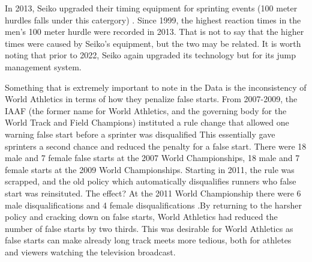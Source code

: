 \documentclass[12pt, letterpaper, titlepage]{article}
\begin{document}
In 2013, Seiko upgraded their timing equipment for sprinting events (100 meter hurdles
falls under this catergory) \citep{WorldAthletics_2013}.  Since 1999, the highest reaction 
times in the men's 100 meter hurdle were recorded in 2013.  That is not to say that the higher 
times were caused by Seiko's equipment, but the two may be related.  It is worth noting that prior
to 2022, Seiko again upgraded its technology but for its jump management system.

Something that is extremely important to note in the Data is the inconsistency of World Athletics in terms of how they penalize false starts.  From 2007-2009, the IAAF (the former name for World Athletics, and the governing body for the World Track and Field Champions) instituted a rule change that allowed one warning false start before a sprinter was disqualified \citep{False-Start}  This essentially gave sprinters a second chance and reduced
the penalty for a false start.  There were 18 male and 7 female false starts at the 2007
World Championships, 18 male and 7 female starts at the 2009 World Championships.
Starting in 2011, the rule was scrapped, and the old policy which automatically disqualifies runners who false start was reinsituted.  The effect? At the 2011 World
Championship there were 6 male disqualifications and 4 female disqualifications \citep{False-Start} .By returning to the harsher policy and cracking down on false starts, World Athletics had reduced the number of false starts by two thirds. This was desirable for
World Athletics as false starts can make already long track meets more tedious, both
for athletes and viewers watching the television broadcast.\citep{Pilianidis}
\end{document}
